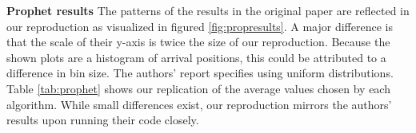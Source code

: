 
\textbf{Prophet results}
\FloatBarrier
The patterns of the results in the original paper are reflected in our reproduction as visualized in figured \ref{fig:propresults}. A major difference is that the scale of their y-axis is twice the size of our reproduction. Because the shown plots are a histogram of arrival positions, this could be attributed to a difference in bin size. The authors' report specifies using uniform distributions. Table \ref{tab:prophet} shows our replication of the average values chosen by each algorithm. While small differences exist, our reproduction mirrors the authors' results upon running their code closely.
\begin{table}[h]
\centering
{}
\caption{Prophet experiment claims by the author compared to reproduced results.}
\label{tab:prophet}
\end{table}

